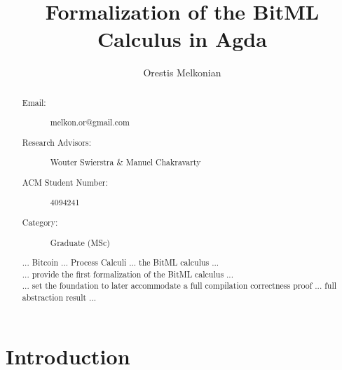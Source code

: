 \documentclass[acmsmall,nonacm=true,screen=true]{acmart}
\begin{document}
\sloppy %

\title{Formalization of the BitML Calculus in Agda}

\author{Orestis Melkonian}

\begin{abstract}
  \begin{description}
    \item[Email:] melkon.or@gmail.com
    \item[Research Advisors:] Wouter Swierstra \& Manuel Chakravarty
    \item[ACM Student Number:] 4094241
    \item[Category:] Graduate (MSc)
  \end{description}
\vspace{1cm}
... Bitcoin ... Process Calculi ... the BitML calculus ...\\
... provide the first formalization of the BitML calculus ...\\
... set the foundation to later accommodate a full compilation correctness proof ... full abstraction result ...\\
\end{abstract}

\maketitle

\section{Introduction}
\label{sec:intro}


\nocite{*}

\end{document}
